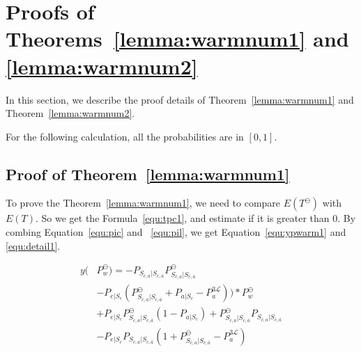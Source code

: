 \newpage
\section{Proofs of Theorems~\ref{lemma:warmnum1} and \ref{lemma:warmnum2}}
\label{appendixa}
In this section, we describe the proof details of Theorem~\ref{lemma:warmnum1} and Theorem~\ref{lemma:warmnum2}.

For the following calculation,
 all the probabilities are in $[0,1]$.

\subsection{Proof of Theorem~\ref{lemma:warmnum1}}
\label{appendixa1}
To prove the Theorem~\ref{lemma:warmnum1}, we need to compare $E(T^{\ominus})$ with $E(T)$.
So we get the Formula~\ref{equ:tpc1}, and estimate if it is greater than $0$.
By combing Equation~\ref{equ:pic} and ~\ref{equ:pil}, we get Equation~\ref{equ:ypwarm1} and \ref{equ:detail1}.

\begin{equation}
\label{equ:ypwarm1}
\begin{split}
y(&P_{w}^{\ominus}) = -P_{S_{\bar{c}, a}|S_{\bar{c},\bar{a}}}P_{S_{\bar{c}, a}|S_{\bar{c},\bar{a}}}^{\ominus} \\
&-P_{e|S_{c}}(P_{S_{\bar{c}, a}|S_{\bar{c},\bar{a}}}^{\ominus}+P_{a|S_{c}}-P_{a}^{\mathfrak{3}\mathcal{L}}))*P_{w}^{\ominus} \\
& +  P_{e|S_{c}}P_{S_{\bar{c}, a}|S_{\bar{c},\bar{a}}}^{\ominus}(1-P_{a|S_{c}})+P_{S_{\bar{c}, a}|S_{\bar{c},\bar{a}}}^{\ominus}P_{S_{\bar{c}, a}|S_{\bar{c},\bar{a}}}\\
& - P_{e|S_{c}}P_{S_{\bar{c}, a}|S_{\bar{c},\bar{a}}}(1+P_{S_{\bar{c}, a}|S_{\bar{c},\bar{a}}}^{\ominus}-P_{a}^{\mathfrak{3}\mathcal{L}}) \,
\end{split}\end{equation}

